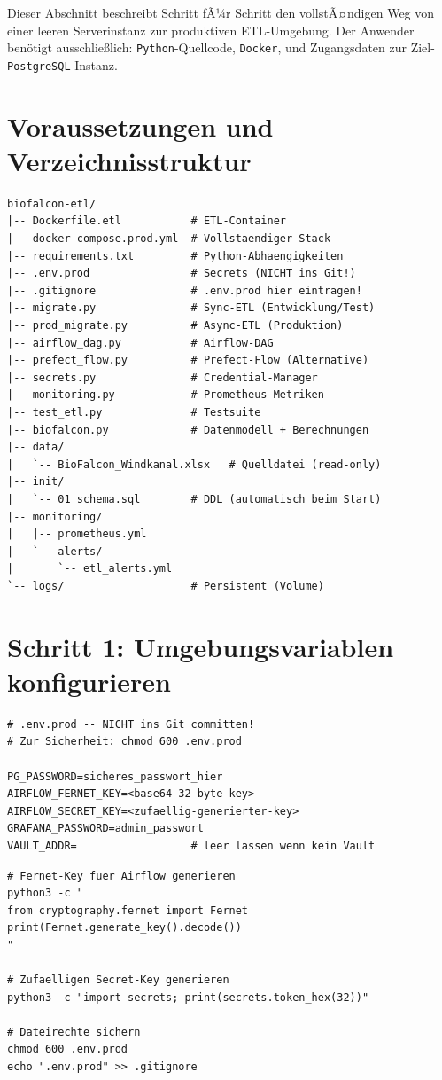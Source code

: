 ﻿\documentclass[12pt,a4paper]{report}
\theoremstyle{definition}
\theoremstyle{remark}
\newcommand{\pg}{\texttt{PostgreSQL}}
\newcommand{\py}{\texttt{Python}}
\newcommand{\docker}{\texttt{Docker}}
\begin{document}
Dieser Abschnitt beschreibt Schritt fÃ¼r Schritt den vollstÃ¤ndigen
Weg von einer leeren Serverinstanz zur produktiven ETL-Umgebung.
Der Anwender ben\"otigt ausschlie\ss{}lich: \py-Quellcode, \docker{},
und Zugangsdaten zur Ziel-\pg-Instanz.

\section{Voraussetzungen und Verzeichnisstruktur}

\begin{lstlisting}[style=bash, caption={Verzeichnisstruktur des Produktiv-Deployments}]
biofalcon-etl/
|-- Dockerfile.etl           # ETL-Container
|-- docker-compose.prod.yml  # Vollstaendiger Stack
|-- requirements.txt         # Python-Abhaengigkeiten
|-- .env.prod                # Secrets (NICHT ins Git!)
|-- .gitignore               # .env.prod hier eintragen!
|-- migrate.py               # Sync-ETL (Entwicklung/Test)
|-- prod_migrate.py          # Async-ETL (Produktion)
|-- airflow_dag.py           # Airflow-DAG
|-- prefect_flow.py          # Prefect-Flow (Alternative)
|-- secrets.py               # Credential-Manager
|-- monitoring.py            # Prometheus-Metriken
|-- test_etl.py              # Testsuite
|-- biofalcon.py             # Datenmodell + Berechnungen
|-- data/
|   `-- BioFalcon_Windkanal.xlsx   # Quelldatei (read-only)
|-- init/
|   `-- 01_schema.sql        # DDL (automatisch beim Start)
|-- monitoring/
|   |-- prometheus.yml
|   `-- alerts/
|       `-- etl_alerts.yml
`-- logs/                    # Persistent (Volume)
\end{lstlisting}

\section{Schritt 1: Umgebungsvariablen konfigurieren}

\begin{lstlisting}[style=bash, caption={.env.prod: Produktivkonfiguration (Beispiel)}]
# .env.prod -- NICHT ins Git committen!
# Zur Sicherheit: chmod 600 .env.prod

PG_PASSWORD=sicheres_passwort_hier
AIRFLOW_FERNET_KEY=<base64-32-byte-key>
AIRFLOW_SECRET_KEY=<zufaellig-generierter-key>
GRAFANA_PASSWORD=admin_passwort
VAULT_ADDR=                  # leer lassen wenn kein Vault
\end{lstlisting}

\begin{lstlisting}[style=bash, caption={Generierung sicherer Schlussel}]
# Fernet-Key fuer Airflow generieren
python3 -c "
from cryptography.fernet import Fernet
print(Fernet.generate_key().decode())
"

# Zufaelligen Secret-Key generieren
python3 -c "import secrets; print(secrets.token_hex(32))"

# Dateirechte sichern
chmod 600 .env.prod
echo ".env.prod" >> .gitignore
\end{lstlisting}
\end{document}
